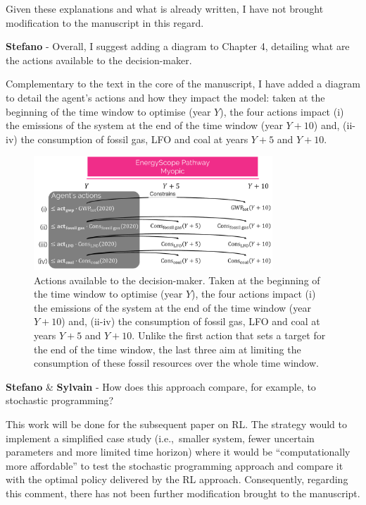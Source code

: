 \documentclass[12pt,a4paper]{article}
\def\ie{i.e.,\ }
\begin{document}
Given these explanations and what is already written, I have not brought modification to the manuscript in this regard.

\begin{mdframed}[style=comment] %
{\color{orange} \textbf{Stefano}} - Overall, I suggest adding a diagram to Chapter 4, detailing what are the actions available to the decision-maker.
\end{mdframed}

\noindent Complementary to the text in the core of the manuscript, I have added a diagram to detail the agent's actions and how they impact the model: taken at the beginning of the time window to optimise (year $Y$), the four actions impact (i) the emissions of the system at the end of the time window (year $Y+10$) and, (ii-iv) the consumption of fossil gas, LFO and coal at years $Y+5$ and $Y+10$.

\begin{figure}[!htbp]
\centering
\includegraphics[width=0.8\textwidth]{Schematic_actions.pdf}
\caption{Actions available to the decision-maker. Taken at the beginning of the time window to optimise (year $Y$), the four actions impact (i) the emissions of the system at the end of the time window (year $Y+10$) and, (ii-iv) the consumption of fossil gas, LFO and coal at years $Y+5$ and $Y+10$. Unlike the first action that sets a target for the end of the time window, the last three aim at limiting the consumption of these fossil resources over the whole time window.}
\label{fig:Schematic_actions}
\end{figure}

\begin{mdframed}[style=comment] %
{\color{orange} \textbf{Stefano}} \& {\color{purple} \textbf{Sylvain}} - How does this approach compare, for example, to stochastic programming?
\end{mdframed}

\noindent This work will be done for the subsequent paper on RL. The strategy would to implement a simplified case study (\ie smaller system, fewer uncertain parameters and more limited time horizon) where it would be ``computationally more affordable'' to test the stochastic programming approach and compare it with the optimal policy delivered by the RL approach. Consequently, regarding this comment, there has not been further modification brought to the manuscript.
\end{document}
